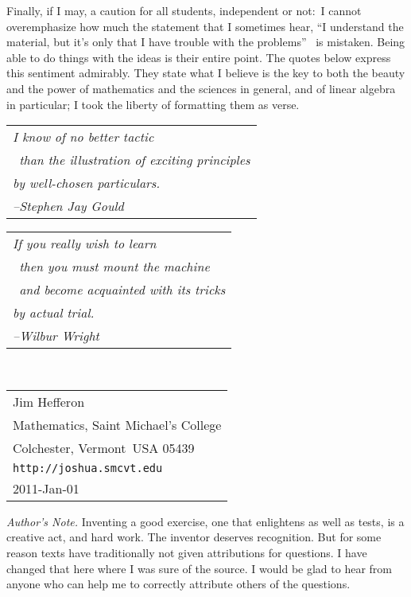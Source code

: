 \bigskip
Finally, if I may, a caution for all students, independent or not:~I 
cannot overemphasize how much the statement
that I sometimes hear, ``I understand the material, but it's only 
that I have trouble with the problems''\ %
is mistaken.
Being able to do things with the ideas is their entire point.
The quotes below express this sentiment admirably.
They state what I believe is the key to both the beauty and the power
of mathematics and the sciences in general, 
and of linear algebra in particular; I took the liberty of formatting
them as verse.

\bigskip
\par\noindent\begin{tabular}[t]{@{}l@{}}
  \textit{I know of no better tactic}                     \\
  \textit{\ than the illustration of exciting principles} \\
  \textit{by well-chosen particulars.}                    \\
  \hspace*{1in}\textit{--Stephen Jay Gould}
\end{tabular}

\bigskip
\par\noindent\begin{tabular}[t]{@{}l@{}}   
\textit{If you really wish to learn}                     \\
   \textit{\ then you must mount the machine}  \\ 
   \textit{\ and become acquainted with its tricks} \\
   \textit{by actual trial.}                    \\
   \hspace*{1in}\textit{--Wilbur Wright}
\end{tabular}

\par\ \hfill\begin{tabular}[t]{@{}l@{}}
                       Jim Hef{}feron            \\
                       Mathematics, Saint Michael's College \\ 
                       Colchester, Vermont\ USA 05439  \\     
                       \texttt{http://joshua.smcvt.edu} \\
                       2011-Jan-01
                    \end{tabular}

\vfill
\par\noindent\textit{Author's Note.}
Inventing a good exercise, one that enlightens as well as tests, 
is a creative act, and hard work.
The inventor deserves recognition.
But for some reason texts have traditionally not given attributions for
questions.
I have changed that here where I was sure of the source.
I would be glad to hear from anyone who can help me to correctly
attribute others of the questions.   
%
